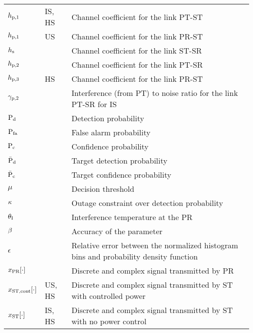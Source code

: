 \begin{longtable}{p{}p{}p{}}
       $h_{\text{p,1}}$                  & IS, HS &         Channel coefficient for the link PT-ST \\
       $h_{\text{p,1}}$                  & US &             Channel coefficient for the link PR-ST \\
       $h_{\text{s}}$                   &  &     Channel coefficient for the link ST-SR \\
       $h_{\text{p,2}}$                  &  &     Channel coefficient for the link PT-SR \\
       $h_{\text{p,3}}$                 & HS &             Channel coefficient for the link PR-ST \\
       ${\gamma}_{\text{p,2}}$                & &             Interference (from PT) to noise ratio for the link PT-SR for IS \\

       $\text{P}_{\text{d}}$                   & &             Detection probability \\ 
       $\text{P}_{\text{fa}}$                  & &             False alarm probability \\ 
       $\text{P}_{\text{c}}$                  & &             Confidence probability \\ 
       $\bar{\text{P}}_{\text{d}}$                  & &             Target detection probability \\ 
       $\bar{\text{P}}_{\text{c}}$                 & &             Target confidence probability \\ 
       $\mu$                   & &             Decision threshold \\ 
       $\kappa$                  & &             Outage constraint over detection probability \\ 
       $\theta_{\text{I}}$                  & &             Interference temperature at the PR \\ 
       $\beta$	               & &             Accuracy of the parameter \\	
       $\epsilon$	       & &             Relative error between the normalized histogram bins and probability density function  \\	

	$x_{\text{PR}}[\cdot]$       & &             Discrete and complex signal transmitted by PR \\	
	$x_{\text{ST,cont}}[\cdot]$       & US, HS &             Discrete and complex signal transmitted by ST with controlled power \\	
	$x_{\text{ST}}[\cdot]$       & IS, HS &             Discrete and complex signal transmitted by ST with no power control\\	


\end{longtable}
